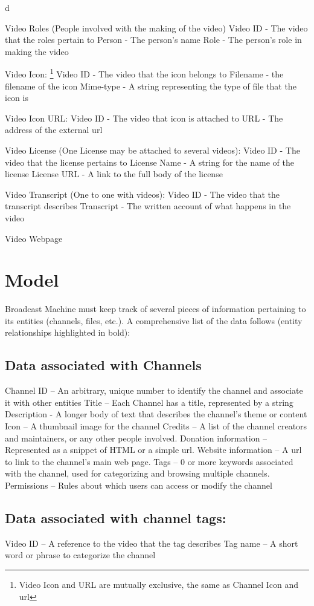 d\documentclass[a4paper,12pt]{report}
\begin{document}
Video Roles (People involved with the making of the video)
	Video ID - The video that the roles pertain to
	Person - The person's name
	Role - The person's role in making the video

Video Icon:
\footnote{Video Icon and URL are mutually exclusive, the same as Channel Icon and url}
	Video ID - The video that the icon belongs to
	Filename - the filename of the icon
	Mime-type - A string representing the type of file that the icon is

Video Icon URL:
	Video ID - The video that icon is attached to
	URL - The address of the external url

Video License (One License may be attached to several videos):
	Video ID - The video that the license pertains to
	License Name - A string for the name of the license
	License URL - A link to the full body of the license

Video Transcript (One to one with videos):
	Video ID - The video that the transcript describes
	Transcript - The written account of what happens in the video

Video Webpage
	

\section{Model}
Broadcast Machine must keep track of  several pieces of information pertaining to its entities (channels, files, etc.). 
A comprehensive list of the data follows (entity relationships highlighted in bold):

\subsection{Data associated with Channels}
Channel ID – An arbitrary, unique number to identify the channel and  associate it with other entities
Title – Each Channel has a title, represented by a string
Description - A longer body of text that describes the channel's theme or content
Icon – A thumbnail image for the channel
Credits – A list of the channel creators and maintainers, or any other people involved. 
Donation information – Represented as a snippet of HTML or a simple url.
Website information – A url to link to the channel's main web page.
Tags – 0 or more keywords associated with the channel, used for categorizing and browsing multiple channels.
Permissions – Rules about which users can access or modify the channel

\subsection{Data associated with channel tags:}
Video ID – A reference to the video that the tag describes
Tag name – A short word or phrase to categorize the channel
\end{document}
